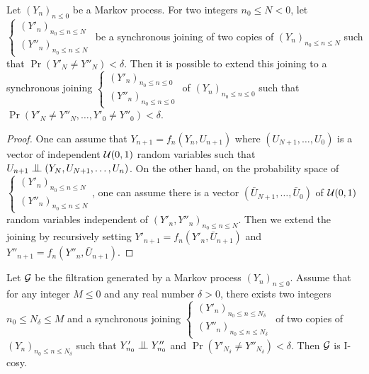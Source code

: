 \documentclass[12pt,a4paper]{article}
\begin{document}
\begin{lemma}\label{lemma:extendjoining}
Let ${(Y_n)}_{n \leq 0}$ be a Markov process. 
For two integers $n_0 \leq N < 0$, let 
$\left\{\begin{smallmatrix} {(Y'_n)}_{n_0 \leq n \leq N} \\ 
{(Y''_n)}_{n_0 \leq n \leq N}
\end{smallmatrix}\right.$ be a synchronous joining of two copies of  
${(Y_n)}_{n_0 \leq n \leq N}$ such that 
$\Pr(Y'_N \neq Y''_N) < \delta$. 
Then it is possible to extend this joining to 
a synchronous joining 
$\left\{\begin{smallmatrix} {(Y'_n)}_{n_0 \leq n \leq 0} \\ 
{(Y''_n)}_{n_0 \leq n \leq 0}
\end{smallmatrix}\right.$ 
of ${(Y_n)}_{n_0 \leq n \leq 0}$ such that 
$\Pr(Y'_N \neq Y''_N, \ldots, Y'_0 \neq Y''_0) < \delta$.
\end{lemma}

\begin{proof}
One can assume that $Y_{n+1} = f_n(Y_n, U_{n+1})$ where 
$(U_{N+1}, \ldots, U_0)$ is a vector of independent $\mathcal{U}(0,1)$ random variables 
such that 
$U_{n+1} \indep (Y_{N}, U_{N+1}, \ldots, U_n)$. 
On the other hand, on the probability space of 
$\left\{\begin{smallmatrix} {(Y'_n)}_{n_0 \leq n \leq N} \\ 
{(Y''_n)}_{n_0 \leq n \leq N}
\end{smallmatrix}\right.$, one can assume there is a vector  
$(\bar U_{N+1}, \ldots, \bar U_0)$ of $\mathcal{U}(0,1)$ random variables 
independent of ${(Y'_n, Y''_n)}_{n_0 \leq n \leq N}$. 
Then we extend the joining by recursively setting 
$Y'_{n+1} = f_n(Y'_n, \bar U_{n+1})$ and $Y''_{n+1} = f_n(Y''_n, \bar U_{n+1})$.
\end{proof}

\begin{lemma}\label{lemma:markovcosy}
Let $\mathcal{G}$ be the filtration generated by a Markov process ${(Y_n)}_{n \leq 0}$. 
Assume that for any integer $M \leq 0$ and any real number $\delta >0$, 
there exists two integers $n_0 \leq N_\delta \leq M$ and a synchronous joining 
$\left\{\begin{smallmatrix} {(Y'_n)}_{n_0 \leq n \leq N_\delta} \\ 
{(Y''_n)}_{n_0 \leq n \leq N_\delta}
\end{smallmatrix}\right.$  of two copies of  
${(Y_n)}_{n_0 \leq n \leq N_\delta}$ such that 
$Y'_{n_0} \indep Y''_{n_0}$ and $\Pr(Y'_{N_\delta} \neq Y''_{N_\delta}) < \delta$.  
Then $\mathcal{G}$ is I-cosy.
\end{lemma}
\end{document}
